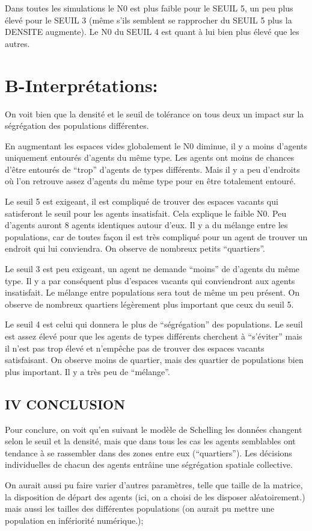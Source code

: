 \documentclass[
]{article}
\begin{document}
Dans toutes les simulations le N0 est plus faible pour le SEUIL 5, un
peu plus élevé pour le SEUIL 3 (même s'ils semblent se rapprocher du
SEUIL 5 plus la DENSITE augmente). Le N0 du SEUIL 4 est quant à lui bien
plus élevé que les autres.

\hypertarget{b-interpruxe9tations}{%
\section{B-Interprétations:}\label{b-interpruxe9tations}}

On voit bien que la densité et le seuil de tolérance on tous deux un
impact sur la ségrégation des populations différentes.

En augmentant les espaces vides globalement le N0 diminue, il y a moins
d'agents uniquement entourés d'agents du même type. Les agents ont moins
de chances d'être entourés de ``trop'' d'agents de types différents.
Mais il y a peu d'endroits où l'on retrouve assez d'agents du même type
pour en être totalement entouré.

Le seuil 5 est exigeant, il est compliqué de trouver des espaces vacants
qui satisferont le seuil pour les agents insatisfait. Cela explique le
faible N0. Peu d'agents auront 8 agents identiques autour d'eux. Il y a
du mélange entre les populations, car de toutes façon il est très
compliqué pour un agent de trouver un endroit qui lui conviendra. On
observe de nombreux petits ``quartiers''.

Le seuil 3 est peu exigeant, un agent ne demande ``moins'' de d'agents
du même type. Il y a par conséquent plus d'espaces vacants qui
conviendront aux agents insatisfait. Le mélange entre populations sera
tout de même un peu présent. On observe de nombreux quartiers légèrement
plus important que ceux du seuil 5.

Le seuil 4 est celui qui donnera le plus de ``ségrégation'' des
populations. Le seuil est assez élevé pour que les agents de types
différents cherchent à ``s'éviter'' mais il n'est pas trop élevé et
n'empêche pas de trouver des espaces vacants satisfaisant. On observe
moins de quartier, mais des quartier de populations bien plus important.
Il y a très peu de ``mélange''.

\hypertarget{iv-conclusion}{%
\subsection{IV CONCLUSION}\label{iv-conclusion}}

Pour conclure, on voit qu'en suivant le modèle de Schelling les données
changent selon le seuil et la densité, mais que dans tous les cas les
agents semblables ont tendance à se rassembler dans des zones entre eux
(``quartiers''). Les décisions individuelles de chacun des agents
entrâine une ségrégation spatiale collective.

On aurait aussi pu faire varier d'autres paramètres, telle que taille de
la matrice, la disposition de départ des agents (ici, on a choisi de les
disposer aléatoirement.) mais aussi les tailles des différentes
populations (on aurait pu mettre une population en infériorité
numérique.);
\end{document}

